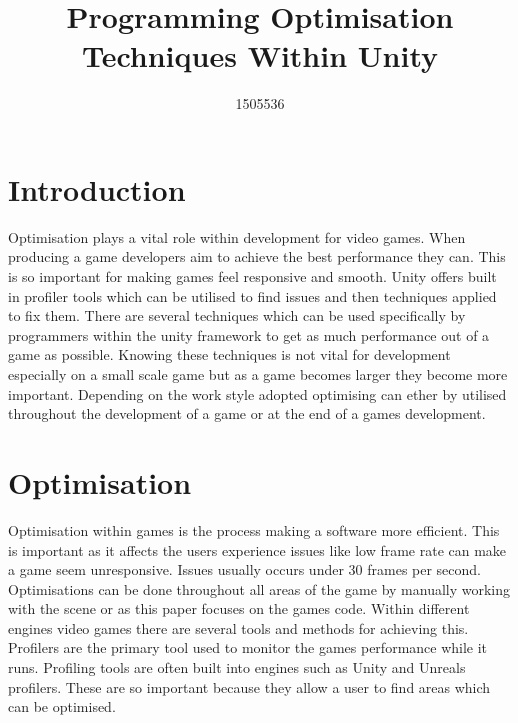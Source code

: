 \documentclass[journal]{IEEEtran}
\begin{document}
%
\title{Programming Optimisation Techniques Within Unity}

\author{1505536}


\maketitle

\section{Introduction}
Optimisation plays a vital role within development for video games.
When producing a game developers aim to achieve the best performance they can.
This is so important for making games feel responsive and smooth.
Unity offers built in profiler tools which can be utilised to find issues and then techniques applied to fix them.
There are several techniques which can be used specifically by programmers within the unity framework to get as much performance out of a game as possible.
Knowing these techniques is not vital for development especially on a small scale game but as a game becomes larger they become more important.
Depending on the work style adopted optimising can ether by utilised throughout the development of a game or at the end of a games development.

\section{Optimisation}
Optimisation within games is the process making a software more efficient.
This is important as it affects the users experience issues like low frame rate can make a game seem unresponsive.
Issues usually occurs under 30 frames per second.%
Optimisations can be done throughout all areas of the game by manually working with the scene or as this paper focuses on the games code.
Within different engines video games there are several tools and methods for achieving this.
Profilers are the primary tool used to monitor the games performance while it runs.
Profiling tools are often built into engines such as Unity and Unreals profilers.
These are so important because they allow a user to find areas which can be optimised.
\end{document}
